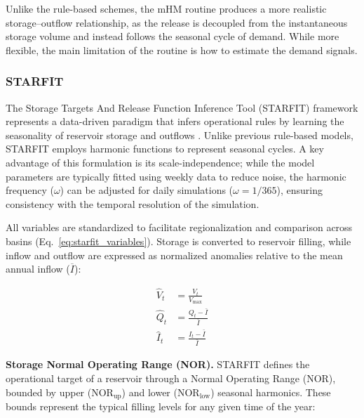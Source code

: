 \documentclass[hess, manuscript]{copernicus}
\begin{document}
Unlike the rule-based schemes, the mHM routine produces a more realistic storage–outflow relationship, as the release is decoupled from the instantaneous storage volume and instead follows the seasonal cycle of demand. While more flexible, the main limitation of the routine is how to estimate the demand signals.

\subsubsection{STARFIT}
\label{sec:starfit}

The Storage Targets And Release Function Inference Tool (STARFIT) framework represents a data-driven paradigm that infers operational rules by learning the seasonality of reservoir storage and outflows \citep{Turner2021}. Unlike previous rule-based models, STARFIT employs harmonic functions to represent seasonal cycles. A key advantage of this formulation is its scale-independence; while the model parameters are typically fitted using weekly data to reduce noise, the harmonic frequency ($\omega$) can be adjusted for daily simulations ($\omega=1/365$), ensuring consistency with the temporal resolution of the simulation.

All variables are standardized to facilitate regionalization and comparison across basins (Eq.~\ref{eq:starfit_variables}). Storage is converted to reservoir filling, while inflow and outflow are expressed as normalized anomalies relative to the mean annual inflow ($\overline{I}$): 

\begin{subequations}
\label{eq:starfit_variables}
    \begin{align}
        \hat{V}_{t} &= \frac{V_t}{V_{\max}} \label{eq:standard_volume} \\
        \hat{Q}_{t} &= \frac{Q_t - \bar{I}}{\bar{I}} \label{eq:standard_outflow} \\
        \hat{I}_{t} &= \frac{I_t - \bar{I}}{\bar{I}} \label{eq:standard_inflow}
    \end{align}
\end{subequations}

\medskip
\textbf{Storage Normal Operating Range (NOR).} STARFIT defines the operational target of a reservoir through a Normal Operating Range (NOR), bounded by upper ($\text{NOR}_{\text{up}}$) and lower ($\text{NOR}_{\text{low}}$) seasonal harmonics. These bounds represent the typical filling levels for any given time of the year:
\end{document}
